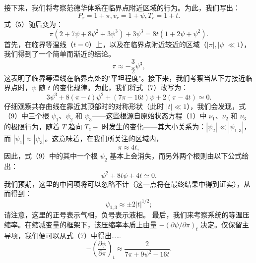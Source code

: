 接下来，我们将考察范德华体系在临界点附近区域的行为。为此，我们写出：
\begin{equation}\tag{12.2.5}\label{eq:12.2.5}
P _ { r } = 1 + \pi ,  v _ { r } = 1 + \psi ,  T _ { r } = 1 + t .
\end{equation}
式（5）随后变为：
\begin{equation}\tag{12.2.6}\label{eq:12.2.6}
\pi \left( 2 + 7 \psi + 8 \psi ^{2} + 3 \psi ^{3} \right) + 3 \psi ^{3} = 8 t \left( 1 + 2 \psi + \psi ^{2} \right) .
\end{equation}
首先，在临界等温线（\(t=0\)）上，以及在临界点附近较近的区域（\(|\pi|, |\psi| \ll 1\)），我们得到了一个简单而渐近的结论。
\begin{equation}\tag{12.2.7}\label{eq:12.2.7}
\pi \approx - \frac { 3 } { 2 } \psi ^{3} ,
\end{equation}
这表明了临界等温线在临界点处的"平坦程度"。接下来，我们考察当从下方接近临界点时，\(\psi\) 随 \(t\) 的变化规律。为此，我们将式（7）改写为：
\begin{equation}\tag{12.2.8}\label{eq:12.2.8}
3 \psi ^{3} + 8 \left( \pi - t \right) \psi ^{2} + \left( 7 \pi - 16 t \right) \psi + 2 \left( \pi - 4 t \right) \simeq 0 .
\end{equation}
仔细观察共存曲线在靠近其顶部时的对称形状（此时 \(|t| \ll 1\)），我们会发现，式（9）中三个根 \(\psi_1\)、\(\psi_2\) 和 \(\psi_3\)——这些根源自原始状态方程（1）中 \(\nu_1\)、\(\nu_2\) 和 \(\nu_3\) 的极限行为，随着 \(T\) 趋向 \(T_c-\) 时发生的变化——其大小关系为：\(|\psi_2| \ll |\psi_{1,3}|\)，而 \(|\psi_1| \approx |\psi_3|\)。这意味着，在我们所关注的区域内，
\begin{equation}\tag{12.2.9}\label{eq:12.2.9}
\pi \approx 4 t ,
\end{equation}
因此，式（9）中的其中一个根 \(\psi_2\) 基本上会消失，而另外两个根则由以下公式给出：
\begin{equation}\tag{12.2.10}\label{eq:12.2.10}
\psi ^{2} + 8 t \psi + 4 t \simeq 0 .
\end{equation}
我们预期，这里的中间项将可以忽略不计（这一点将在最终结果中得到证实），从而得到：
\begin{equation}\tag{12.2.11}\label{eq:12.2.11}
\psi _ { 1 , 3 } \approx \pm 2 | t | ^{1 / 2} ;
\end{equation}
请注意，这里的正号表示气相，负号表示液相。
最后，我们来考察系统的等温压缩率。在缩减变量的框架下，该压缩率本质上由量 \(-(\partial\psi/\partial\pi)_t\) 决定。仅保留主导项，我们便可以从式（7）中得出\ldots\ldots{}
\begin{equation}\tag{12.2.12}\label{eq:12.2.12}
- \left( \frac { \partial \psi } { \partial \pi } \right) _ { t } \approx \frac { 2 } { 7 \pi + 9 \psi ^{2} - 16 t } .
\end{equation}
